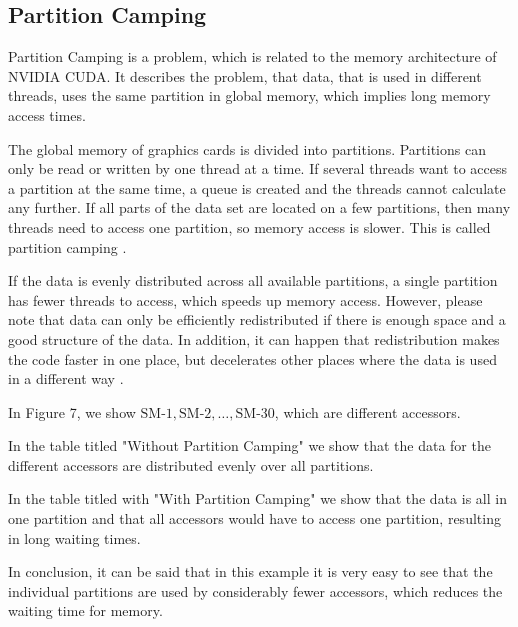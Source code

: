 \documentclass[conference]{IEEEtran}
\begin{document}
	\subsection{Partition Camping}
		
		
		Partition Camping is a problem, which is related to the memory architecture of NVIDIA CUDA. It describes the problem, that data, that is used in different threads, uses the same partition in global memory, which implies long memory access times. 
		
		
		The global memory of graphics cards is divided into partitions. Partitions can only be read or written by one thread at a time. If several threads want to access a partition at the same time, a queue is created and the threads cannot calculate any further. If all parts of the data set are located on a few partitions, then many threads need to access one partition, so memory access is slower. This is called partition camping  \cite{yang2010gpgpu} \cite{aji2011bounding}.
		
		If the data is evenly distributed across all available partitions, a single partition has fewer threads to access, which speeds up memory access. However, please note that data can only be efficiently redistributed if there is enough space and a good structure of the data.  In addition, it can happen that redistribution makes the code faster in one place, but decelerates other places where the data is used in a different way \cite{yang2010gpgpu} \cite{aji2011bounding}.
		
		
		In Figure 7, we show $\text{SM-1}, \text{SM-2}, \dots, \text{SM-30}$, which are different accessors. 
		
		In the table titled "Without Partition Camping" we show that the data for the different accessors are distributed evenly over all partitions. 
		
		In the table titled with "With Partition Camping" we show that the data is all in one partition and that all accessors would have to access one partition, resulting in long waiting times.
		
		In conclusion, it can be said that in this example it is very easy to see that the individual partitions are used by considerably fewer accessors, which reduces the waiting time for memory.
			
\end{document}
